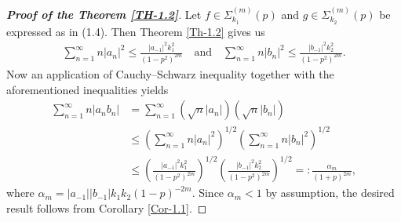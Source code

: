 \documentclass[10pt,a4paper]{amsart}
\begin{document}
\begin{proof}[\bf Proof of the Theorem \ref{TH-1.2}]
	Let $f \in \Sigma^{(m)}_{k_1}(p)$ and $g \in \Sigma^{(m)}_{k_2}(p)$ be expressed as in (1.4).
	Then Theorem \ref{Th-1.2} gives us
\begin{align*}
	\sum_{n=1}^{\infty} n |a_n|^2 \leq \frac{|a_{-1}|^2k_1^2}{(1-p^2)^{2m}}
	\quad \text{and} \quad
	\sum_{n=1}^{\infty} n |b_n|^2 \leq \frac{|b_{-1}|^2k_2^2}{(1-p^2)^{2m}}.
\end{align*}
	Now an application of Cauchy--Schwarz inequality together with the aforementioned
	inequalities yields
	\begin{align*}
		\sum_{n=1}^{\infty} n |a_n b_n|
		&= \sum_{n=1}^{\infty} (\sqrt{n}|a_n|)(\sqrt{n}|b_n|)\\&\leq \left( \sum_{n=1}^{\infty} n|a_n|^2 \right)^{1/2}
		\left( \sum_{n=1}^{\infty} n|b_n|^2 \right)^{1/2}\\&\leq \left(\frac{|a_{-1}|^2k_1^2}{(1-p^2)^{2m}}\right)^{1/2}\left(\frac{|b_{-1}|^2k_2^2}{(1-p^2)^{2m}}\right)^{1/2}
		=: \frac{\alpha_m}{(1+p)^{2m}},
	\end{align*}
	where $\alpha_m = |a_{-1}||b_{-1}|k_1 k_2 (1-p)^{-2m}$. Since $\alpha_m < 1$ by assumption, the desired
	result follows from Corollary \ref{Cor-1.1}.
\end{proof}
\end{document}
